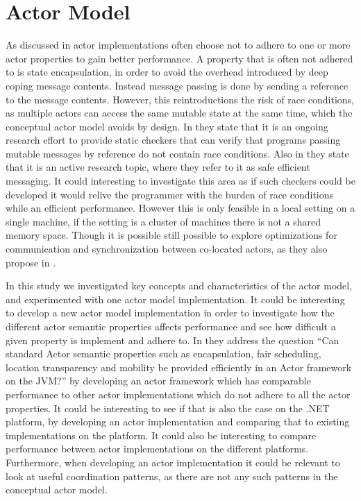 \section{Actor Model}
As discussed in  actor implementations often choose not to adhere to one or more actor properties to gain better performance. A property that is often not adhered to is state encapsulation, in order to avoid the overhead introduced by deep coping message contents. Instead message passing is done by sending a reference to the message contents. However, this reintroductions the risk of race conditions, as multiple actors can access the same mutable state at the same time, which the conceptual actor model avoids by design. In \cite[p. 15]{haller2012actors} they state that it is an ongoing research effort to provide static checkers that can verify that programs passing mutable messages by reference do not contain race conditions. Also in \cite[p. 9]{karmani2009actor} they state that it is an active research topic, where they refer to it as safe efficient messaging. It could interesting to investigate this area as if such checkers could be developed it would relive the programmer with the burden of race conditions while an efficient performance. However this is only feasible in a local setting on a single machine, if the setting is a cluster of machines there is not a shared memory space. Though it is possible still possible to explore optimizations for communication and synchronization between co-located actors, as they also propose in \cite[p. 9]{karmani2009actor}.

In this study we investigated key concepts and characteristics of the actor model, and experimented with one actor model implementation. It could be interesting to develop a new actor model implementation in order to investigate how the different actor semantic properties affects performance and see how difficult a given property is implement and adhere to. In \cite{karmani2009actor} they address the question ``Can standard Actor semantic properties such as encapsulation, fair scheduling, location transparency and mobility be provided efficiently in an Actor framework on the JVM?'' by developing an actor framework which has comparable performance to other actor implementations which do not adhere to all the actor properties. It could be interesting to see if that is also the case on the .NET platform, by developing an actor implementation and comparing that to existing implementations on the platform. It could also be interesting to compare performance between actor implementations on the different platforms. Furthermore, when developing an actor implementation it could be relevant to look at useful coordination patterns, as there are not any such patterns in the conceptual actor model.

